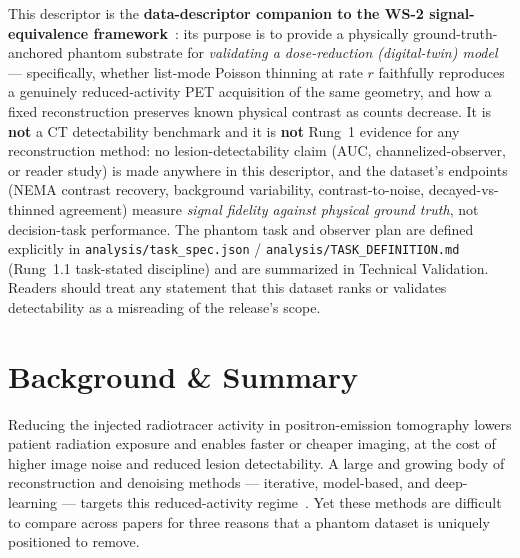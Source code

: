 \documentclass[twoside,11pt]{article}
\begin{document}
This descriptor is the \textbf{data-descriptor companion to the WS-2
signal-equivalence framework}~\citep{ws2framework}: its purpose is to provide a
physically ground-truth-anchored phantom substrate for \emph{validating a
dose-reduction (digital-twin) model} --- specifically, whether list-mode Poisson
thinning at rate $r$ faithfully reproduces a genuinely reduced-activity PET
acquisition of the same geometry, and how a fixed reconstruction preserves known
physical contrast as counts decrease. It is \textbf{not} a CT detectability
benchmark and it is \textbf{not} Rung~1 evidence for any reconstruction method:
no lesion-detectability claim (AUC, channelized-observer, or reader study) is
made anywhere in this descriptor, and the dataset's endpoints (NEMA contrast
recovery, background variability, contrast-to-noise, decayed-vs-thinned
agreement) measure \emph{signal fidelity against physical ground truth}, not
decision-task performance. The phantom task and observer plan are defined
explicitly in \texttt{analysis/task\_spec.json} /
\texttt{analysis/TASK\_DEFINITION.md} (Rung~1.1 task-stated discipline) and are
summarized in Technical Validation. Readers should treat any statement that this
dataset ranks or validates detectability as a misreading of the release's scope.

\section*{Background \& Summary}

Reducing the injected radiotracer activity in positron-emission tomography lowers
patient radiation exposure and enables faster or cheaper imaging, at the cost of
higher image noise and reduced lesion detectability. A large and growing body of
reconstruction and denoising methods --- iterative, model-based, and
deep-learning --- targets this reduced-activity regime~\citep{lowcountpet,reader2021artificial}.
Yet these methods are difficult to compare across papers for three reasons that a
phantom dataset is uniquely positioned to remove.
\end{document}

